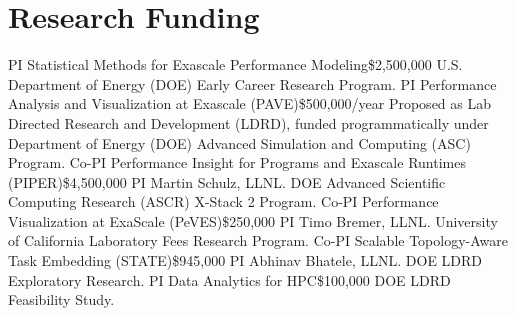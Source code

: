 \section{Research Funding}
		{PI}
		{Statistical Methods for Exascale Performance Modeling}{}{\$2,500,000}
		{U.S. Department of Energy (DOE) Early Career Research Program.}
		{PI}
		{Performance Analysis and Visualization at Exascale (PAVE)}{}{\$500,000/year}
		{Proposed as Lab Directed Research and Development (LDRD), funded
		 programmatically under\newline
		 Department of Energy (DOE) Advanced Simulation and Computing (ASC) Program.}
		{Co-PI}
		{Performance Insight for Programs and Exascale Runtimes (PIPER)}{}{\$4,500,000}
		{PI Martin Schulz, LLNL. DOE Advanced Scientific Computing Research (ASCR)
		 X-Stack 2 Program.}
		{Co-PI}
		{Performance Visualization at ExaScale (PeVES)}{}{\$250,000}
		{PI Timo Bremer, LLNL. University of California Laboratory Fees Research Program.}
		{Co-PI}
		{Scalable Topology-Aware Task Embedding (STATE)}{}{\$945,000}
		{PI Abhinav Bhatele, LLNL. DOE LDRD Exploratory Research.}
		{PI}
		{Data Analytics for HPC}{}{\$100,000}
		{DOE LDRD Feasibility Study.}
